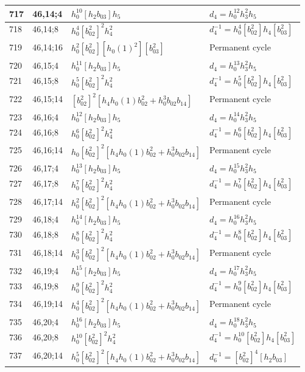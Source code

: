 \documentclass{article}
\begin{document}
\begin{longtable}{|l|l|>{\raggedright\arraybackslash}p{6cm}|>{\raggedright\arraybackslash}p{6cm}|}
\hline
717 & 46,14;4 & $h_0^{10}[h_2b_{03}]h_5$ &$d_{4}=h_0^{12}h_3^2h_5$\\
\hline
718 & 46,14;8 & $h_0^4[b_{02}^2]^2h_4^2$ & $d_{4}^{-1}=h_0^4[b_{02}^2]h_4[b_{03}^2]$\\
\hline
719 & 46,14;16 & $h_0^2[b_{02}^2][h_0(1)^2][b_{03}^2]$ & Permanent cycle\\
\hline
720 & 46,15;4 & $h_0^{11}[h_2b_{03}]h_5$ &$d_{4}=h_0^{13}h_3^2h_5$\\
\hline
721 & 46,15;8 & $h_0^5[b_{02}^2]^2h_4^2$ & $d_{4}^{-1}=h_0^5[b_{02}^2]h_4[b_{03}^2]$\\
\hline
722 & 46,15;14 & $[b_{02}^2]^2[h_4h_0(1)b_{02}^2 + h_0^3b_{02}b_{14}]$ & Permanent cycle\\
\hline
723 & 46,16;4 & $h_0^{12}[h_2b_{03}]h_5$ &$d_{4}=h_0^{14}h_3^2h_5$\\
\hline
724 & 46,16;8 & $h_0^6[b_{02}^2]^2h_4^2$ & $d_{4}^{-1}=h_0^6[b_{02}^2]h_4[b_{03}^2]$\\
\hline
725 & 46,16;14 & $h_0[b_{02}^2]^2[h_4h_0(1)b_{02}^2 + h_0^3b_{02}b_{14}]$ & Permanent cycle\\
\hline
726 & 46,17;4 & $h_0^{13}[h_2b_{03}]h_5$ &$d_{4}=h_0^{15}h_3^2h_5$\\
\hline
727 & 46,17;8 & $h_0^7[b_{02}^2]^2h_4^2$ & $d_{4}^{-1}=h_0^7[b_{02}^2]h_4[b_{03}^2]$\\
\hline
728 & 46,17;14 & $h_0^2[b_{02}^2]^2[h_4h_0(1)b_{02}^2 + h_0^3b_{02}b_{14}]$ & Permanent cycle\\
\hline
729 & 46,18;4 & $h_0^{14}[h_2b_{03}]h_5$ &$d_{4}=h_0^{16}h_3^2h_5$\\
\hline
730 & 46,18;8 & $h_0^8[b_{02}^2]^2h_4^2$ & $d_{4}^{-1}=h_0^8[b_{02}^2]h_4[b_{03}^2]$\\
\hline
731 & 46,18;14 & $h_0^3[b_{02}^2]^2[h_4h_0(1)b_{02}^2 + h_0^3b_{02}b_{14}]$ & Permanent cycle\\
\hline
732 & 46,19;4 & $h_0^{15}[h_2b_{03}]h_5$ &$d_{4}=h_0^{17}h_3^2h_5$\\
\hline
733 & 46,19;8 & $h_0^9[b_{02}^2]^2h_4^2$ & $d_{4}^{-1}=h_0^9[b_{02}^2]h_4[b_{03}^2]$\\
\hline
734 & 46,19;14 & $h_0^4[b_{02}^2]^2[h_4h_0(1)b_{02}^2 + h_0^3b_{02}b_{14}]$ & Permanent cycle\\
\hline
735 & 46,20;4 & $h_0^{16}[h_2b_{03}]h_5$ &$d_{4}=h_0^{18}h_3^2h_5$\\
\hline
736 & 46,20;8 & $h_0^{10}[b_{02}^2]^2h_4^2$ & $d_{4}^{-1}=h_0^{10}[b_{02}^2]h_4[b_{03}^2]$\\
\hline
737 & 46,20;14 & $h_0^5[b_{02}^2]^2[h_4h_0(1)b_{02}^2 + h_0^3b_{02}b_{14}]$ & $d_{6}^{-1}=[b_{02}^2]^4[h_2b_{03}]$\\

\end{longtable}
\end{document}
